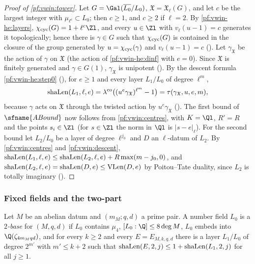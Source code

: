 \begin{proof}[Proof of \cref{pf:vwin:tower}]
Let $G=\Gal(\overline{L_0}/L_0)$, $\mathfrak X=\mathfrak X_\ell(G)$, and let $c$ be the largest integer with $\mu_{\ell^c}\subset
L_0$; then $c\ge1$, and $c\ge2$ if $\ell=2$. By \cref{pf:vwin-he:layers}, $\vwincyc(G)=1+\ell^c\Zl$, and every $u\in\Zl$ with
$v_\ell(u-1)=c$ generates it topologically; hence there is $\gamma\in G$ such that $\chi_{\mathrm{cyc}}(G)$ is contained in the closure of
the group generated by $u=\chi_{\mathrm{cyc}}(\gamma)$ and $v_\ell(u-1)=c$ (). Let $\gamma_{\mathfrak X}$
be the action of $\gamma$ on $\mathfrak X$ (the action of \cref{pf:vwin-he:dinf} with $e=0$). Since $\mathfrak X$ is finitely generated
and $\gamma\in G(1)$, $\gamma_{\mathfrak X}$ is unipotent (). By the descent formula
\cref{pf:vwin-he:step0} (), for
$e\ge1$ and every layer $L_1/L_0$ of degree $\ell^m$,
\begin{equation}\label{pf:vwin:descent}
 \mathrm{shaLen}(L_1,\ell,e)=\lambda^{\mathrm{co}}\bigl((u^e\gamma_{\mathfrak X})^{\ell^m}-1\bigr)=\tau(\gamma_{\mathfrak X},u,e,m),
\end{equation}
because $\gamma$ acts on $\mathfrak X$ through the twisted action by $u^e\gamma_{\mathfrak X}$
(). The first bound of $\sfname{ABound}$ now follows from \cref{pf:vwin:centres}, with
$K=\Ql$, $R'=R$ and the points $s_i\in\Zl$ (for $s\in\Zl$ the norm in $\Ql$ is $|s-e|_\ell$). For the second bound let $L_2/L_0$ be a
layer of degree $\ell^{j_0}$ and $D$ an $\ell$-datum of $L_2$. By \cref{pf:vwin:centres} and \eqref{pf:vwin:descent},
$\mathrm{shaLen}(L_1,\ell,e)\le\mathrm{shaLen}(L_2,\ell,e)+R\max(m-j_0,0)$, and $\mathrm{shaLen}(L_2,\ell,e)=\mathrm{shaLen}(D,e)\le\mathrm{VLen}(D,e)$ by Poitou--Tate
duality, since $L_2$ is totally imaginary ().
\end{proof}

\subsubsection{Fixed fields and the two-part}

\begin{definition}\label{pf:vwin:twobase}
Let $M$ be an abelian datum and $(m_M;q,d)$ a prime pair. A number field $L_0$ is a \emph{$2$-base} for $(M,q,d)$ if $L_0$ contains
$\mu_4$, $[L_0:\Q]\le8\deg M$, $L_0$ embeds into $\Q(\zeta_{4m_Mqd})$, and for every $k\ge2$ and every $E=E_{M,k,q,d}$ there is a layer
$L_1/L_0$ of degree $2^{m'}$ with $m'\le k+2$ such that $\mathrm{shaLen}(E,2,j)\le1+\mathrm{shaLen}(L_1,2,j)$ for all $j\ge1$.
\end{definition}

